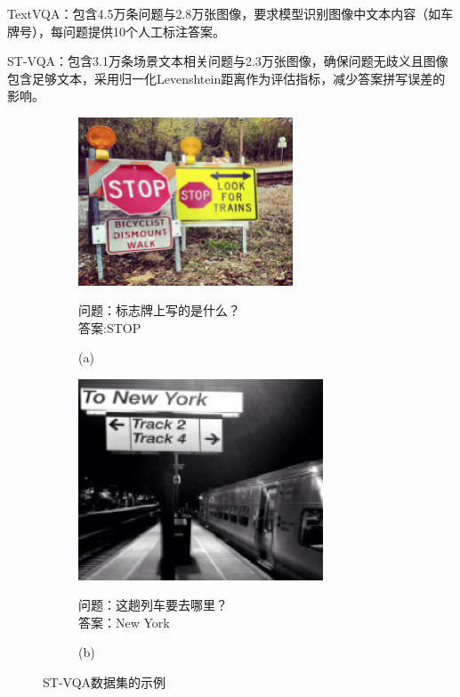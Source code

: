 \begin{enumerate}[itemsep=0pt,parsep=0pt]
​TextVQA\cite{singh2019towards}：包含4.5万条问题与2.8万张图像，要求模型识别图像中文本内容（如车牌号），每问题提供10个人工标注答案。

​ST-VQA\cite{biten2019scene}：包含3.1万条场景文本相关问题与2.3万张图像，确保问题无歧义且图像包含足够文本，采用归一化Levenshtein距离作为评估指标，减少答案拼写误差的影响。
\begin{figure}
    \begin{subfigure}[b]{0.45\textwidth}
        \centering
        \includegraphics[width=0.7\textwidth, keepaspectratio]{figures/STVQA-A.png}
        \begin{center}
            \footnotesize 问题：标志牌上写的是什么？\\
            \footnotesize 答案:STOP\\
        \end{center}
        \caption*{(a)}
    \end{subfigure}
    \hfill
    \begin{subfigure}[b]{0.45\textwidth}
        \centering
        \includegraphics[width=0.8\textwidth, keepaspectratio]{figures/STVQA-B.png}
        \begin{center}
            \footnotesize 问题：这趟列车要去哪里？\\
            \footnotesize 答案：New York\\
        \end{center}
        \caption*{(b)}
    \end{subfigure}
    \caption{ST-VQA数据集的示例}
    \centering
    \label{fig:ST-VQA-example}
\end{figure}
\end{enumerate}

